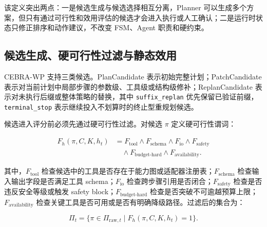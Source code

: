 该定义突出两点：一是候选生成与候选选择相互分离，Planner
可以生成多个方案，但只有通过可行性和效用评估的候选才会进入执行或人工确认；二是运行时状态只修正排序和动作建议，不改变
FSM、Agent 职责和硬约束。

\subsection{候选生成、硬可行性过滤与静态效用}\label{ux5019ux9009ux751fux6210ux786cux53efux884cux6027ux8fc7ux6ee4ux4e0eux9759ux6001ux6548ux7528}

CEBRA-WP 支持三类候选。PlanCandidate 表示初始完整计划；PatchCandidate
表示对当前计划中局部步骤的参数级、工具级或结构级修补；ReplanCandidate
表示对未执行后缀或整体策略的替换，其中 \texttt{suffix\_replan}
优先保留已验证前缀，\texttt{terminal\_stop}
表示继续投入不划算时的终止型重规划候选。

候选进入评分前必须先通过硬可行性过滤。对候选 $\pi$
定义硬可行性谓词：

\begin{equation}
\begin{aligned}
F_h(\pi,C,K,h_t)
  &= F_{\mathrm{tool}}\land F_{\mathrm{schema}}\land F_{\mathrm{io}}\land F_{\mathrm{safety}}\\
  &\quad{}\land F_{\mathrm{budget\mbox{-}hard}}\land F_{\mathrm{availability}}.
\end{aligned}
\end{equation}

\begin{symboldefs}
\end{symboldefs}

其中，$F_{\mathrm{tool}}$
检查候选中的工具是否存在于能力图或适配器注册表；$F_{\mathrm{schema}}$
检查输入输出字段是否满足工具 schema；$F_{\mathrm{io}}$
检查跨步骤引用是否闭合；$F_{\mathrm{safety}}$ 检查是否违反安全等级或触发
safety block；$F_{\mathrm{budget\mbox{-}hard}}$
检查是否突破不可逾越预算上限；$F_{\mathrm{availability}}$
检查关键工具是否可用或是否有明确降级路径。过滤后的集合为：

\begin{equation}
\Pi_t=\{\pi\in\Pi_{\mathrm{raw},t}\mid F_h(\pi,C,K,h_t)=1\}.
\end{equation}


